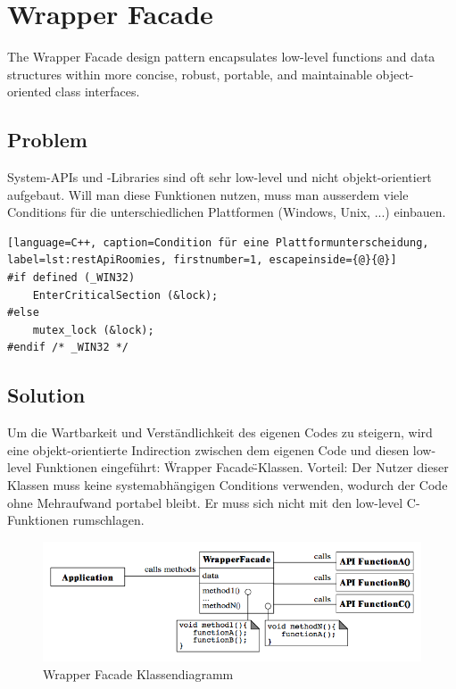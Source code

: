 \section{Wrapper Facade}
\label{sec:wrapper-facade}

The Wrapper Facade design pattern encapsulates low-level functions and data structures within more concise, robust, portable, and maintainable object-oriented class interfaces.

\subsection{Problem}

System-APIs und -Libraries sind oft sehr low-level und nicht objekt-orientiert aufgebaut. Will man diese Funktionen nutzen, muss man ausserdem viele Conditions für die unterschiedlichen Plattformen (Windows, Unix, ...) einbauen.

\begin{lstlisting}[language=C++, caption=Condition für eine Plattformunterscheidung, label=lst:restApiRoomies, firstnumber=1, escapeinside={@}{@}]
#if defined (_WIN32)
	EnterCriticalSection (&lock);
#else
	mutex_lock (&lock);
#endif /* _WIN32 */
\end{lstlisting}


\subsection{Solution}

Um die Wartbarkeit und Verständlichkeit des eigenen Codes zu steigern, wird eine objekt-orientierte Indirection zwischen dem eigenen Code und diesen low-level Funktionen eingeführt: \"Wrapper Facade\"-Klassen. Vorteil: Der Nutzer dieser Klassen muss keine systemabhängigen Conditions verwenden, wodurch der Code ohne Mehraufwand portabel bleibt. Er muss sich nicht mit den low-level C-Funktionen rumschlagen.

\begin{figure}[H]
	\centering
	\includegraphics[width=12cm]{content/posa2/wrapper-facade/images/class-diagram.png}
	\caption{Wrapper Facade Klassendiagramm}
\end{figure}

